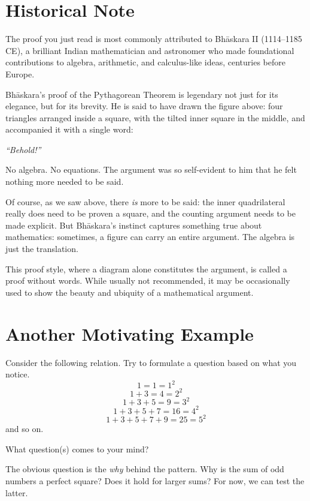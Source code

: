 \section{Historical Note}

The proof you just read is most commonly attributed to Bh\={a}skara II (1114--1185 CE), a brilliant Indian mathematician and astronomer who made foundational contributions to algebra, arithmetic, and calculus-like ideas, centuries before Europe. 

Bh\={a}skara's proof of the Pythagorean Theorem is legendary not just for its elegance, but for its brevity. He is said to have drawn the figure above: four triangles arranged inside a square, with the tilted inner square in the middle, and accompanied it with a single word:
\begin{center}
  \textit{``Behold!''}
\end{center}

No algebra. No equations. The argument was so self-evident to him that he felt nothing more needed to be said.

Of course, as we saw above, there \emph{is} more to be said: the inner quadrilateral really does need to be proven a square, and the counting argument needs to be made explicit. But Bh\={a}skara's instinct captures something true about mathematics: sometimes, a figure can carry an entire argument. The algebra is just the translation.

This proof style, where a diagram alone constitutes the argument, is called a proof without words. While usually not recommended, it may be occasionally used to show the beauty and ubiquity of a mathematical argument.

\section{Another Motivating Example}
Consider the following relation. Try to formulate a question based on what you notice.
\[
1 = 1 = 1^2
\]
\[
1 + 3 = 4 = 2^2
\]
\[
1 + 3 + 5 = 9 = 3^2
\]
\[
1 + 3 + 5 + 7 = 16 = 4^2
\]
\[
1 + 3 + 5 + 7 + 9 = 25 = 5^2
\]
and so on. 

\begin{exercise}
    What question(s) comes to your mind? 
\end{exercise}

The obvious question is the \emph{why} behind the pattern. Why is the sum of odd numbers a perfect square? Does it hold for larger sums? For now, we can test the latter.

